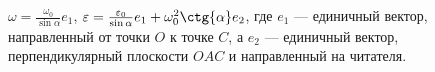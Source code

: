$\omega = \frac{\omega _0}{\sin{\alpha}}e_1$,
$\varepsilon = \frac{\varepsilon _0}{\sin{\alpha}}e_1 +
\omega^2_0\ctg{\alpha}e_2$, где $e_1$ --- единичный вектор,
направленный от точки $O$ к точке $C$, а $e_2$ --- единичный вектор,
перпендикулярный плоскости $OAC$ и направленный на читателя.
